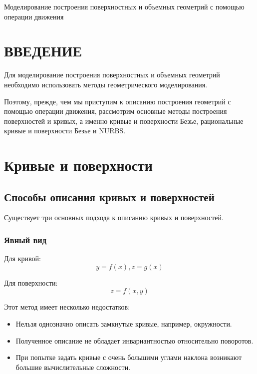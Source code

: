 \documentclass{bmstu}
\begin{document}
\makecourseworktitle
{} %
{} %
{Моделирование построения поверхностных и объемных геометрий с помощью операции движения} %
{} %
{} %
{} %
\chapter*{ВВЕДЕНИЕ}
Для моделирование построения поверхностных и объемных геометрий необходимо использовать методы геометрического моделирования.

Поэтому, прежде, чем мы приступим к описанию построения геометрий с помощью операции движения, рассмотрим основные методы построения поверхностей и кривых, а именно  кривые и поверхности Безье, рациональные кривые и поверхности Безье и NURBS.


\chapter{Кривые и поверхности}
\section{Способы описания кривых и поверхностей}
Существует три основных подхода к описанию кривых и поверхностей.
\subsection{Явный вид}

Для кривой:
\begin{equation*}
    y=f(x), z = g(x)
\end{equation*}

Для поверхности:
\begin{equation*}
    z = f(x, y)
\end{equation*}

Этот метод имеет несколько недостатков:
\begin{itemize}
    \item Нельзя однозначно описать замкнутые кривые, например, окружности.
    \item Полученное описание не обладает инвариантностью относительно поворотов.
    \item При попытке задать кривые с очень большими углами наклона возникают большие вычислительные сложности.
\end{itemize}
\end{document}
